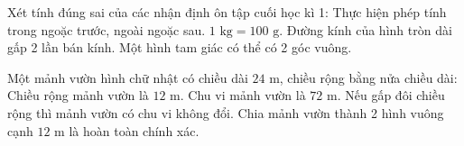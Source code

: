 \begin{ex} %
Xét tính đúng sai của các nhận định ôn tập cuối học kì 1:
\choiceTF
{\True Thực hiện phép tính trong ngoặc trước, ngoài ngoặc sau.}
{$1\text{ kg} = 100\text{ g}$.}
{\True Đường kính của hình tròn dài gấp 2 lần bán kính.}
{Một hình tam giác có thể có 2 góc vuông.}
\end{ex}

\begin{ex} %
Một mảnh vườn hình chữ nhật có chiều dài $24\text{ m}$, chiều rộng bằng nửa chiều dài:
\choiceTF
{\True Chiều rộng mảnh vườn là $12\text{ m}$.}
{\True Chu vi mảnh vườn là $72\text{ m}$.}
{Nếu gấp đôi chiều rộng thì mảnh vườn có chu vi không đổi.}
{\True Chia mảnh vườn thành 2 hình vuông cạnh $12\text{ m}$ là hoàn toàn chính xác.}
\end{ex}

